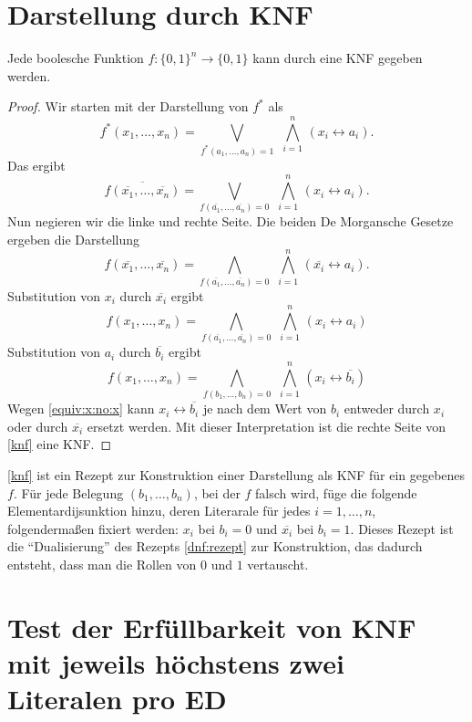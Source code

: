 \section{Darstellung durch KNF}

\begin{thm}
	Jede boolesche Funktion $f : \{0,1\}^n \to \{0,1\}$ kann durch eine KNF gegeben werden. 
\end{thm} 
\begin{proof}
		Wir starten mit der Darstellung von $f^\ast$ als 
		\[
			f^\ast(x_1,\ldots,x_n) = \bigvee_{f^\ast(a_1,\ldots,a_n)=1} \ \, \bigwedge_{i=1}^n \, (x_i \leftrightarrow a_i).
		\]
		Das ergibt 
		\[
			\overline{ f(\overline{x_1},\ldots,\overline{x_n})} = \bigvee_{f(\overline{a_1},\ldots,\overline{a_n}) = 0} \ \, \bigwedge_{i=1}^n  \, (x_i \leftrightarrow a_i). 
		\]
		Nun negieren wir die linke und rechte Seite. Die beiden De Morgansche Gesetze ergeben die Darstellung 
		\[	
				f(\overline{x_1},\ldots,\overline{x_n}) = \bigwedge_{f(\overline{a_1},\ldots,\overline{a_n})=0} \ \, \bigwedge_{i=1}^n  \, (\overline{x_i} \leftrightarrow a_i). 
		\]
		Substitution von $x_i$ durch $\overline{x_i}$ ergibt 
		\[
				f(x_1,\ldots,x_n) = \bigwedge_{f(\overline{a_1},\ldots,\overline{a_n})=0} \ \, \bigwedge_{i=1}^n  \, (x_i \leftrightarrow a_i)
		\]
		Substitution von $a_i$ durch $\overline{b_i}$ ergibt
		\begin{equation} \label{knf} 
			f(x_1,\ldots,x_n) = \bigwedge_{f(b_1,\ldots,b_n)=0} \ \, \bigwedge_{i=1}^n  \, (x_i \leftrightarrow \overline{b_i})
		\end{equation}
		Wegen \eqref{equiv:x:no:x} kann $x_i \leftrightarrow \overline{b_i}$ je nach dem Wert von $b_i$ entweder durch $x_i$ oder durch $\overline{x_i}$ ersetzt werden. Mit dieser Interpretation ist die rechte Seite von \eqref {knf} eine KNF. 
\end{proof} 

\begin{bem}
	\eqref{knf} ist ein Rezept zur Konstruktion einer Darstellung als KNF für ein gegebenes $f$. Für jede Belegung $(b_1,\ldots,b_n)$, bei der $f$ falsch wird, füge die folgende Elementardijsunktion hinzu, deren Literarale für jedes $i=1,\ldots,n$, folgendermaßen fixiert werden: $x_i$ bei $b_i=0$ und $\overline{x_i}$ bei $b_i=1$. Dieses Rezept ist die ``Dualisierung'' des Rezepts \eqref{dnf:rezept} zur Konstruktion, das dadurch entsteht, dass man die Rollen von $0$ und $1$ vertauscht. 
\end{bem} 


\section{Test der Erfüllbarkeit von KNF mit jeweils höchstens zwei Literalen pro ED}


